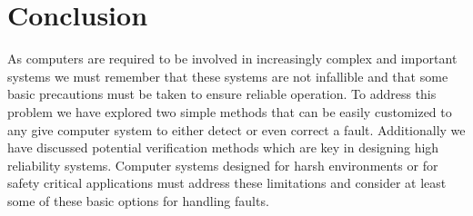 \documentclass[12pt]{article}
\begin{document}
\section{Conclusion}
As computers are required to be involved in increasingly complex and important systems we must remember that these systems are not infallible and that some basic precautions must be taken to ensure reliable operation. To address this problem we have explored two simple methods that can be easily customized to any give computer system to either detect or even correct a fault. Additionally we have discussed potential verification methods which are key in designing high reliability systems. Computer systems designed for harsh environments or for safety critical applications must address these limitations and consider at least some of these basic options for handling faults.

\newpage
\end{document}
